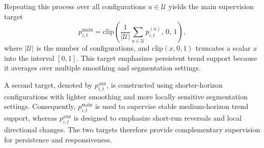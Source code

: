 \documentclass[letterpaper]{article} %
\begin{document}
Repeating this process over all configurations \(u\in\mathcal{U}\) yields the main supervision target
\[
p^{\mathrm{main}}_{i,t}
=
\mathrm{clip}\!\left(
\frac{1}{|\mathcal{U}|}
\sum_{u\in\mathcal{U}} p^{(u)}_{i,t},
\,0,\,1
\right),
\]
where \(|\mathcal{U}|\) is the number of configurations, and \(\mathrm{clip}(x,0,1)\) truncates a scalar \(x\) into the interval \([0,1]\). This target emphasizes persistent trend support because it averages over multiple smoothing and segmentation settings.

A second target, denoted by \(p^{\mathrm{aux}}_{i,t}\), is constructed using shorter-horizon configurations with lighter smoothing and more locally sensitive segmentation settings. Consequently, \(p^{\mathrm{main}}_{i,t}\) is used to supervise stable medium-horizon trend support, whereas \(p^{\mathrm{aux}}_{i,t}\) is designed to emphasize short-run reversals and local directional changes. The two targets therefore provide complementary supervision for persistence and responsiveness.
\end{document}
